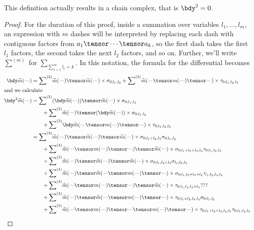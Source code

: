 \documentclass[11pt,leqno]{amsart}
\begin{document}
\begin{lem}
This definition actually results in a chain complex, that is $\bdy^2 = 0$.
\end{lem}
\begin{proof}
\newcommand{\T}{\text{---}}
\newcommand{\ssum}[1]{{\sum}^{(#1)}}
For the duration of this proof, inside a summation over variables $l_1, \ldots, l_m$, an expression with $m$ dashes will be interpreted
by replacing each dash with contiguous factors from $a_1 \tensor \cdots \tensor a_k$, so the first dash takes the first $l_1$ factors, the second
takes the next $l_2$ factors, and so on. Further, we'll write $\ssum{m}$ for $\sum_{\sum_{i=1}^m l_i = k}$.
In this notation, the formula for the differential becomes
\begin{align}
\notag
\bdy \tm(\T) & = \ssum{2} \tm(\T) \tensor \tm(\T) \times \sigma_{0;l_1,l_2} + \ssum{3} \tm(\T \tensor m(\T) \tensor \T) \times \tau_{0;l_1,l_2,l_3} \\
\intertext{and we calculate}
\notag
\bdy^2 \tm(\T) & = \ssum{2} (\bdy \tm(\T)) \tensor \tm(\T) \times \sigma_{0;l_1,l_2} \\
\notag         & \qquad + \ssum{2} \tm(\T) \tensor (\bdy \tm(\T)) \times \sigma_{0;l_1,l_2} \\
\notag         & \qquad + \ssum{3} \bdy \tm(\T \tensor m(\T) \tensor \T) \times \tau_{0;l_1,l_2,l_3} \\
\label{eq:d21} & = \ssum{3} \tm(\T) \tensor \tm(\T) \tensor \tm(\T) \times \sigma_{0;l_1+l_2,l_3} \sigma_{0;l_1,l_2} \\
\label{eq:d22} & \qquad + \ssum{4} \tm(\T \tensor m(\T) \tensor \T) \tensor \tm(\T) \times \sigma_{0;l_1+l_2+l_3,l_4} \tau_{0;l_1,l_2,l_3} \\
\label{eq:d23} & \qquad + \ssum{3} \tm(\T) \tensor \tm(\T) \tensor \tm(\T) \times \sigma_{0;l_1,l_2+l_3} \sigma_{l_1;l_2,l_3} \\
\label{eq:d24} & \qquad + \ssum{4} \tm(\T) \tensor \tm(\T \tensor m(\T) \tensor \T) \times \sigma_{0;l_1,l_2+l_3+l_4} \tau_{l_1;l_2,l_3,l_4} \\
\label{eq:d25} & \qquad + \ssum{4} \tm(\T \tensor m(\T) \tensor \T) \tensor \tm(\T) \times \tau_{0;l_1,l_2,l_3+l_4} ??? \\
\label{eq:d26} & \qquad + \ssum{4} \tm(\T) \tensor \tm(\T \tensor m(\T) \tensor \T) \times \tau_{0;l_1+l_2,l_3,l_4} \sigma_{0;l_1,l_2} \\
\label{eq:d27} & \qquad + \ssum{5} \tm(\T \tensor m(\T) \tensor \T \tensor m(\T) \tensor \T) \times \tau_{0;l_1+l_2+l_3,l_4,l_5} \tau_{0;l_1,l_2,l_3}  \\

\end{align}
\end{proof}
\end{document}
